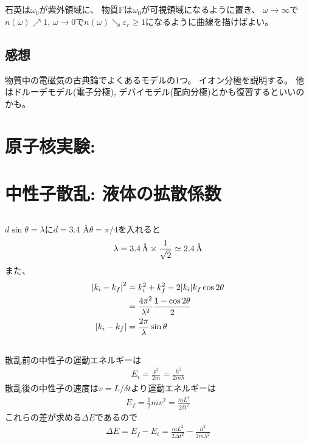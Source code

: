 \documentclass[../../master.tex]{subfiles}
\begin{document}
\subsection{}
石英は\(\omega_0\)が紫外領域に、
物質Fは\(\omega_0\)が可視領域になるように置き、
\(\omega\to\infty\)で\(n(\omega)\nearrow 1\),
\(\omega\to 0\)で\(n(\omega)\searrow \varepsilon_r \ge 1\)になるように曲線を描けばよい。

\subsection*{感想}
物質中の電磁気の古典論でよくあるモデルの1つ。
イオン分極を説明する。
他はドルーデモデル(電子分極), デバイモデル(配向分極)とかも復習するといいのかも。

\clearpage
\section{原子核実験:}

\clearpage
\section{中性子散乱: 液体の拡散係数}
\subsection{}
\(d\sin\theta = \lambda\)に\(d=3.4\) \AA \(\theta = \pi/4\)を入れると
\begin{align}
    \lambda = 3.4 \text{\,\AA} \times \frac{1}{\sqrt{2}} \simeq 2.4 \text{\,\AA}
\end{align}
また、
\begin{align}
    \abs{k_i-k_f}^2 &= k_i^2+k_f^2-2\abs{k_i}{k_f}\cos2\theta\\
    &=\frac{4\pi^2}{\lambda^2}\frac{1-\cos2\theta}{2}\\
    \abs{k_i-k_f} &= \frac{2\pi}{\lambda}\sin\theta
\end{align}

\subsection{}
散乱前の中性子の運動エネルギーは
\begin{align}
    E_i = \frac{p^2}{2m} = \frac{h^2}{2m\lambda}
\end{align}
散乱後の中性子の速度は\(v=L/\delta t\)より運動エネルギーは
\begin{align}
    E_f = \frac{1}{2}mv^2 = \frac{mL^2}{2\delta t^2}
\end{align}
これらの差が求める\(\Delta E\)であるので
\begin{align}
    \Delta E = E_f - E_i = \frac{mL^2}{2\Delta t^2} - \frac{h^2}{2m\lambda^2}
\end{align}
\end{document}
